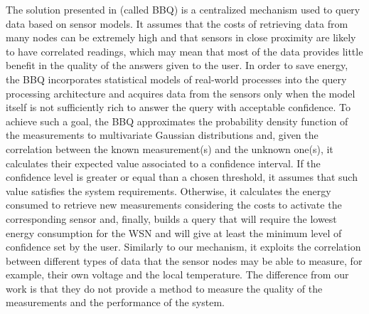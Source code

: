 \documentclass{llncs}
\begin{document}
The solution presented in \cite{Deshpande2004} (called BBQ) is a centralized 
mechanism used to query data based on sensor models. 
It assumes that the costs of retrieving data from many nodes can be extremely 
high and that sensors in close proximity are likely to have correlated readings, 
which may mean that most of the data provides little benefit in the quality of 
the answers given to the user.
In order to save energy, the BBQ incorporates statistical models of real-world 
processes into the query processing architecture and acquires data from the 
sensors only when the model itself is not sufficiently rich to answer the query 
with acceptable confidence.
To achieve such a goal, the BBQ approximates the probability density function 
of the measurements to multivariate Gaussian distributions and, given the 
correlation between the known measurement(s) and the unknown one(s), it 
calculates their expected value associated to a confidence interval. If the 
confidence level is greater or equal than a chosen threshold, it assumes that 
such value satisfies the system requirements. 
Otherwise, it calculates the energy consumed to retrieve new measurements 
considering the costs to activate the corresponding sensor and, finally, builds 
a query that will require the lowest energy consumption for the WSN and will 
give at least the minimum level of confidence set by the user.
Similarly to our mechanism, it exploits the correlation between different types 
of data that the sensor nodes may be able to measure, for example, their own 
voltage and the local temperature. The difference from our work is that they do 
not provide a method to measure the quality of the measurements and the 
performance of the system.
\end{document}
